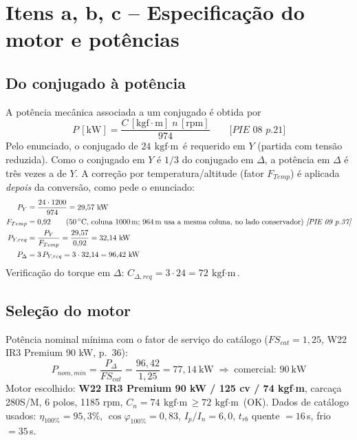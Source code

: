 \documentclass[11pt,a4paper]{article}
\newcommand{\src}[1]{\textit{[#1]}}
\begin{document}
\section{Itens a, b, c -- Especifica\c{c}\~ao do motor e pot\^encias}

\subsection{Do conjugado \`a pot\^encia}
A pot\^encia mec\^anica associada a um conjugado \'e obtida por
\begin{equation}
P\,[\text{kW}] = \frac{C\,[\text{kgf$\cdot$m}]\; n\,[\text{rpm}]}{974}
\qquad \src{PIE 08 p.21}
\end{equation}
Pelo enunciado, o conjugado de $24\ \text{kgf$\cdot$m}$ \'e requerido em $Y$ (partida com tens\~ao reduzida). Como o conjugado em $Y$ \'e $1/3$ do conjugado em $\Delta$, a pot\^encia em $\Delta$ \'e tr\^es vezes a de $Y$. A corre\c{c}\~ao por temperatura/altitude (fator $F_{Temp}$) \'e aplicada \emph{depois} da convers\~ao, como pede o enunciado:
\begin{align}
P_Y &= \frac{24\cdot 1200}{974} = 29{,}57\ \text{kW} \\
F_{Temp} &= 0{,}92 \qquad \text{(50\,$^{\circ}$C, coluna 1000\,m; 964\,m usa a mesma coluna, no lado conservador)} \ \src{PIE 09 p.37} \\
P_{Y,req} &= \frac{P_Y}{F_{Temp}} = \frac{29{,}57}{0{,}92} = 32{,}14\ \text{kW} \\
P_{\Delta} &= 3\,P_{Y,req} = 3\cdot 32{,}14 = 96{,}42\ \text{kW}
\end{align}
Verifica\c{c}\~ao do torque em $\Delta$: $C_{\Delta,req} = 3\cdot 24 = 72\ \text{kgf$\cdot$m}$.

\subsection{Sele\c{c}\~ao do motor}
Pot\^encia nominal m\'inima com o fator de servi\c{c}o do cat\'alogo ($FS_{cat}=1{,}25$, W22 IR3 Premium 90 kW, p.~36):
\begin{equation}
P_{nom,min} = \frac{P_\Delta}{FS_{cat}} = \frac{96{,}42}{1{,}25} = 77{,}14\ \text{kW}
\;\Rightarrow\; \text{comercial: } 90\ \text{kW}
\end{equation}
Motor escolhido: \textbf{W22 IR3 Premium 90 kW / 125 cv / 74 kgf$\cdot$m}, carca\c{c}a 280S/M, 6 polos, 1185 rpm, $C_n=74\ \text{kgf$\cdot$m}\ge 72\ \text{kgf$\cdot$m}$ (OK). Dados de cat\'alogo usados: $\eta_{100\%}=95{,}3\%$, $\cos\varphi_{100\%}=0{,}83$, $I_p/I_n=6{,}0$, $t_{rb}$ quente $=16$\,s, frio $=35$\,s.
\end{document}
